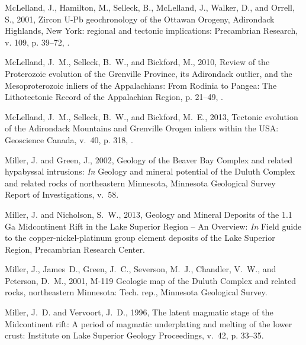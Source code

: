 \documentclass[11pt,letterpaper]{article}
\begin{document}
\begin{thebibliography}{153}
McLelland, J., Hamilton, M., Selleck, B., McLelland, J., Walker, D., and
  Orrell, S., 2001, {Zircon U-Pb geochronology of the Ottawan Orogeny,
  Adirondack Highlands, New York: regional and tectonic implications}:
  Precambrian Research, v. 109, p. 39--72, .

McLelland, J.~M., Selleck, B.~W., and Bickford, M., 2010, {Review of the
  Proterozoic evolution of the Grenville Province, its Adirondack outlier, and
  the Mesoproterozoic inliers of the Appalachians}: From Rodinia to Pangea: The
  Lithotectonic Record of the Appalachian Region, p. 21--49,
  .

McLelland, J.~M., Selleck, B.~W., and Bickford, M.~E., 2013, Tectonic evolution
  of the {A}dirondack {M}ountains and {G}renville {O}rogen inliers within the
  {USA}: Geoscience Canada, v.~40, p. 318, .

Miller, J. and Green, J., 2002, {Geology of the Beaver Bay Complex and related
  hypabyssal intrusions}: \emph{In} Geology and mineral potential of the Duluth
  Complex and related rocks of northeastern Minnesota, Minnesota Geological
  Survey Report of Investigations, v.~58.

Miller, J. and Nicholson, S.~W., 2013, {Geology and Mineral Deposits of the 1.1
  Ga Midcontinent Rift in the Lake Superior Region -- An Overview}: \emph{In}
  Field guide to the copper-nickel-platinum group element deposits of the Lake
  Superior Region, Precambrian Research Center.

Miller, J., James~D., Green, J.~C., Severson, M.~J., Chandler, V.~W., and
  Peterson, D.~M., 2001, {M-119 Geologic map of the Duluth Complex and related
  rocks, northeastern Minnesota}: Tech. rep., Minnesota Geological Survey.

Miller, J.~D. and Vervoort, J.~D., 1996, {The latent magmatic stage of the
  Midcontinent rift: A period of magmatic underplating and melting of the lower
  crust}: Institute on Lake Superior Geology Proceedings, v.~42, p. 33--35.


\end{thebibliography}
\end{document}
